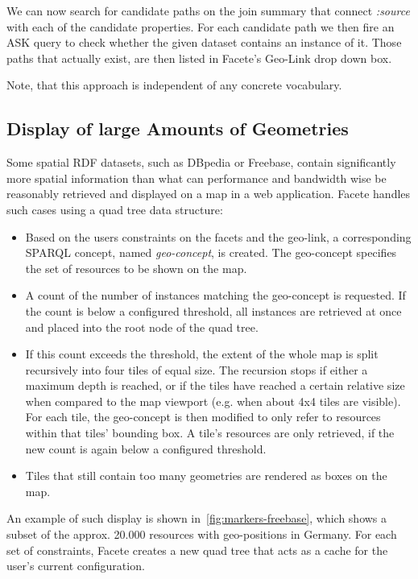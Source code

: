 We can now search for candidate paths on the join summary that connect
\emph{:source} with each of the candidate properties. For each candidate path we
then fire an ASK query to check whether the given dataset contains an instance of it.
Those paths that actually exist, are then listed in Facete's Geo-Link drop down
box.

Note, that this approach is independent of any concrete vocabulary.

\subsection{Display of large Amounts of Geometries}
Some spatial RDF datasets, such as DBpedia or Freebase, contain
significantly more spatial information than what can performance and bandwidth wise be
reasonably retrieved and displayed on a map in a web application.
Facete handles such cases using a quad tree data structure:
\begin{itemize}
  \item Based on the users constraints on the facets and the geo-link,
  a corresponding SPARQL concept, named \emph{geo-concept}, is created. The
  geo-concept specifies the set of resources to be shown on the map.
  \item A count of the number of instances matching the geo-concept is
  requested. If the count is below a configured threshold, all instances are
  retrieved at once and placed into the root node of the quad tree.
  \item If this count exceeds the threshold, the extent of the whole map is
  split recursively into four tiles of equal size. The recursion
  stops if either a maximum depth is reached, or if the tiles have reached a
  certain relative size when compared to the map viewport (e.g. when about
  4x4 tiles are visible).
  For each tile, the
  geo-concept is then modified to only refer to resources within that tiles'
  bounding box. A tile's resources are only retrieved, if the new count is again below a
  configured threshold.
  \item Tiles that still contain too many geometries are rendered as boxes on
  the map.
\end{itemize}
An example of such display is shown in~\autoref{fig:markers-freebase}, which
shows a subset of the approx. 20.000 resources with geo-positions in Germany.
For each set of constraints, Facete creates a new quad tree that acts as a cache
for the user's current configuration.

